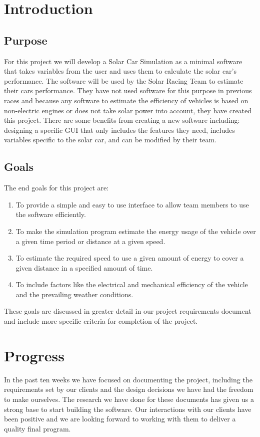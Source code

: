 \begin{singlespace}
\renewcommand{\familydefault}{\sfdefault}

\section{Introduction}

\subsection{Purpose}
For this project we will develop a Solar Car Simulation as a minimal software that takes variables from the user and uses them to calculate the solar car's performance.
The software will be used by the Solar Racing Team to estimate their cars performance. 
They have not used software for this purpose in previous races and because any software to estimate the efficiency of vehicles is based on non-electric engines or does not take solar power into account, they have created this project. 
There are some benefits from creating a new software including: designing a specific GUI that only includes the features they need, includes variables specific to the solar car, and can be modified by their team.

\subsection{Goals}
The end goals for this project are: 
    \begin{enumerate}
        \item To provide a simple and easy to use interface to allow team members to use the software efficiently. 
        \item To make the simulation program estimate the energy usage of the vehicle over a given time period or distance at a given speed.
        \item To estimate the required speed to use a given amount of energy to cover a given distance in a specified amount of time. 
        \item To include factors like the electrical and mechanical efficiency of the vehicle and the prevailing weather conditions. 
    \end{enumerate}
These goals are discussed in greater detail in our project requirements document and include more specific criteria for completion of the project.

\section{Progress}
In the past ten weeks we have focused on documenting the project, including the requirements set by our clients and the design decisions we have had the freedom to make ourselves. The research we have done for these documents has given us a strong base to start building the software. Our interactions with our clients have been positive and we are looking forward to working with them to deliver a quality final program.


\end{singlespace}
